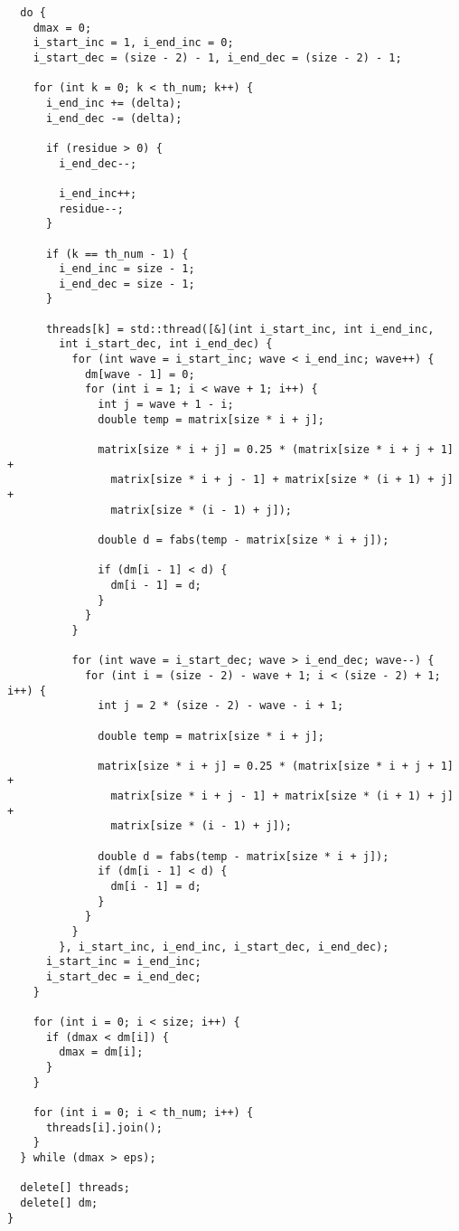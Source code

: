 \documentclass{report}
\begin{document}
\begin{lstlisting}
  do {
    dmax = 0;
    i_start_inc = 1, i_end_inc = 0;
    i_start_dec = (size - 2) - 1, i_end_dec = (size - 2) - 1;

    for (int k = 0; k < th_num; k++) {
      i_end_inc += (delta);
      i_end_dec -= (delta);

      if (residue > 0) {
        i_end_dec--;

        i_end_inc++;
        residue--;
      }

      if (k == th_num - 1) {
        i_end_inc = size - 1;
        i_end_dec = size - 1;
      }

      threads[k] = std::thread([&](int i_start_inc, int i_end_inc,
        int i_start_dec, int i_end_dec) {
          for (int wave = i_start_inc; wave < i_end_inc; wave++) {
            dm[wave - 1] = 0;
            for (int i = 1; i < wave + 1; i++) {
              int j = wave + 1 - i;
              double temp = matrix[size * i + j];

              matrix[size * i + j] = 0.25 * (matrix[size * i + j + 1] +
                matrix[size * i + j - 1] + matrix[size * (i + 1) + j] +
                matrix[size * (i - 1) + j]);

              double d = fabs(temp - matrix[size * i + j]);

              if (dm[i - 1] < d) {
                dm[i - 1] = d;
              }
            }
          }

          for (int wave = i_start_dec; wave > i_end_dec; wave--) {
            for (int i = (size - 2) - wave + 1; i < (size - 2) + 1; i++) {
              int j = 2 * (size - 2) - wave - i + 1;

              double temp = matrix[size * i + j];

              matrix[size * i + j] = 0.25 * (matrix[size * i + j + 1] +
                matrix[size * i + j - 1] + matrix[size * (i + 1) + j] +
                matrix[size * (i - 1) + j]);

              double d = fabs(temp - matrix[size * i + j]);
              if (dm[i - 1] < d) {
                dm[i - 1] = d;
              }
            }
          }
        }, i_start_inc, i_end_inc, i_start_dec, i_end_dec);
      i_start_inc = i_end_inc;
      i_start_dec = i_end_dec;
    }

    for (int i = 0; i < size; i++) {
      if (dmax < dm[i]) {
        dmax = dm[i];
      }
    }

    for (int i = 0; i < th_num; i++) {
      threads[i].join();
    }
  } while (dmax > eps);

  delete[] threads;
  delete[] dm;
}
\end{lstlisting}
\end{document}
